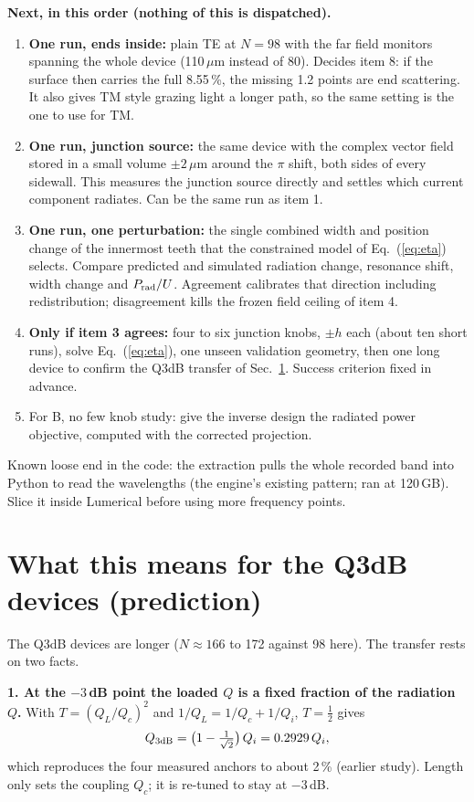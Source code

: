 \documentclass[11pt,a4paper]{article}
\begin{document}
\textbf{Next, in this order (nothing of this is dispatched).}
\begin{enumerate}
\item \textbf{One run, ends inside:} plain TE at $N=98$ with the far field monitors spanning the whole device
(110\,$\mu$m instead of 80). Decides item 8: if the surface then carries the full 8.55\,\%, the missing 1.2 points
are end scattering. It also gives TM style grazing light a longer path, so the same setting is the one to use
for TM.
\item \textbf{One run, junction source:} the same device with the complex vector field stored in a small volume
$\pm2$\,$\mu$m around the $\pi$ shift, both sides of every sidewall. This measures the junction source directly
and settles which current component radiates. Can be the same run as item 1.
\item \textbf{One run, one perturbation:} the single combined width and position change of the innermost teeth
that the constrained model of Eq.~(\ref{eq:eta}) selects. Compare predicted and simulated radiation change,
resonance shift, width change and $P_{\rm rad}/U$. Agreement calibrates that direction including
redistribution; disagreement kills the frozen field ceiling of item 4.
\item \textbf{Only if item 3 agrees:} four to six junction knobs, $\pm h$ each (about ten short runs), solve
Eq.~(\ref{eq:eta}), one unseen validation geometry, then one long device to confirm the Q3dB transfer of
Sec.~\ref{sec:q3db}. Success criterion fixed in advance.
\item For B, no few knob study: give the inverse design the radiated power objective, computed with the
corrected projection.
\end{enumerate}
Known loose end in the code: the extraction pulls the whole recorded band into Python to read the wavelengths
(the engine's existing pattern; ran at 120\,GB). Slice it inside Lumerical before using more frequency points.

\section{What this means for the Q3dB devices (prediction)}\label{sec:q3db}
The Q3dB devices are longer ($N\approx166$ to 172 against 98 here). The transfer rests on two facts.

\textbf{1. At the $-3$\,dB point the loaded $Q$ is a fixed fraction of the radiation $Q$.} With
$T=(Q_L/Q_c)^2$ and $1/Q_L=1/Q_c+1/Q_i$, $T=\tfrac12$ gives
\[
Q_{3\rm dB}=\bigl(1-\tfrac1{\sqrt2}\bigr)\,Q_i=0.2929\,Q_i ,
\]
which reproduces the four measured anchors to about 2\,\% (earlier study). Length only sets the coupling $Q_c$;
it is re-tuned to stay at $-3$\,dB.
\end{document}
